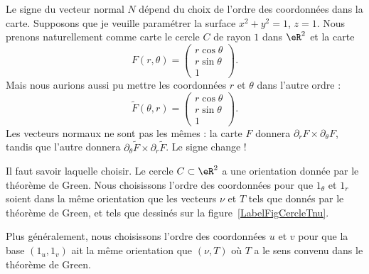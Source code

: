 Le signe du vecteur normal \( N\) dépend du choix de l'ordre des coordonnées dans la carte. Supposons que je veuille paramétrer la surface \( x^2+y^2=1\), \( z=1\). Nous prenons naturellement comme carte le cercle \( C\) de rayon \( 1\) dans \( \eR^2\) et la carte
\begin{equation}
	F(r,\theta)=\begin{pmatrix}
		r\cos\theta \\
		r\sin\theta \\
		1
	\end{pmatrix}.
\end{equation}
Mais nous aurions aussi pu mettre les coordonnées \( r\) et \( \theta\) dans l'autre ordre :
\begin{equation}
	\tilde F(\theta,r)=\begin{pmatrix}
		r\cos\theta \\
		r\sin\theta \\
		1
	\end{pmatrix}.
\end{equation}
Les vecteurs normaux ne sont pas les mêmes : la carte \( F\) donnera \( \partial_rF\times\partial_{\theta}F\), tandis que l'autre donnera \( \partial_{\theta}\tilde F\times\partial_r\tilde F\). Le signe change !

Il faut savoir laquelle choisir. Le cercle \( C\subset \eR^2\) a une orientation donnée par le théorème de Green. Nous choisissons l'ordre des coordonnées pour que \( 1_{\theta}\) et \( 1_{r}\) soient dans la même orientation que les vecteurs \( \nu\) et \( T\) tels que donnés par le théorème de Green, et tels que dessinés sur la figure~\ref{LabelFigCercleTnu}.
\newcommand{\CaptionFigCercleTnu}{L'orientation sur le cercle. Si nous les prenons dans l'ordre, les vecteurs \( (1_r,1_{\theta})\) ont la même orientation que celle donnée par les vecteurs \( (\nu,T)\) donnés par la convention de Green.}


%

Plus généralement, nous choisissons l'ordre des coordonnées \( u\) et \( v\) pour que la base \( (1_u,1_v)\) ait la même orientation que \( (\nu,T)\) où \( T\) a le sens convenu dans le théorème de Green.

